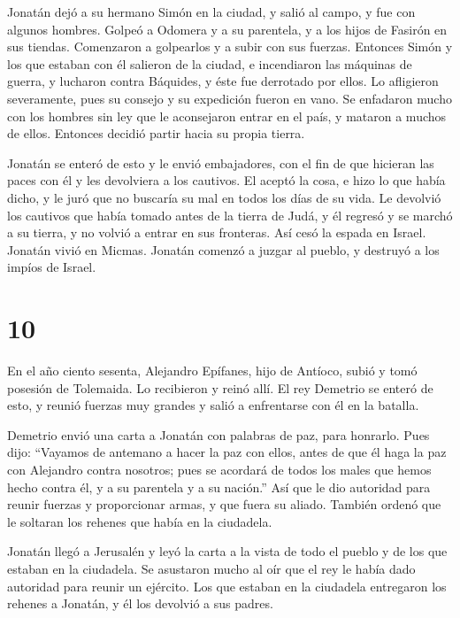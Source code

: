  Jonatán dejó a su hermano Simón en la ciudad, y salió al
campo, y fue con algunos hombres.  Golpeó a Odomera y a
su parentela, y a los hijos de Fasirón en sus tiendas. 
Comenzaron a golpearlos y a subir con sus fuerzas. Entonces Simón y los
que estaban con él salieron de la ciudad, e incendiaron las máquinas de
guerra,  y lucharon contra Báquides, y éste fue derrotado
por ellos. Lo afligieron severamente, pues su consejo y su expedición
fueron en vano.  Se enfadaron mucho con los hombres sin
ley que le aconsejaron entrar en el país, y mataron a muchos de ellos.
Entonces decidió partir hacia su propia tierra.

 Jonatán se enteró de esto y le envió embajadores, con el
fin de que hicieran las paces con él y les devolviera a los cautivos.
 El aceptó la cosa, e hizo lo que había dicho, y le juró
que no buscaría su mal en todos los días de su vida.  Le
devolvió los cautivos que había tomado antes de la tierra de Judá, y él
regresó y se marchó a su tierra, y no volvió a entrar en sus fronteras.
 Así cesó la espada en Israel. Jonatán vivió en Micmas.
Jonatán comenzó a juzgar al pueblo, y destruyó a los impíos de Israel.

\hypertarget{section-9}{%
\section{10}\label{section-9}}

 En el año ciento sesenta, Alejandro Epífanes, hijo de
Antíoco, subió y tomó posesión de Tolemaida. Lo recibieron y reinó allí.
 El rey Demetrio se enteró de esto, y reunió fuerzas muy
grandes y salió a enfrentarse con él en la batalla.

 Demetrio envió una carta a Jonatán con palabras de paz,
para honrarlo.  Pues dijo: ``Vayamos de antemano a hacer
la paz con ellos, antes de que él haga la paz con Alejandro contra
nosotros;  pues se acordará de todos los males que hemos
hecho contra él, y a su parentela y a su nación.''  Así
que le dio autoridad para reunir fuerzas y proporcionar armas, y que
fuera su aliado. También ordenó que le soltaran los rehenes que había en
la ciudadela.

 Jonatán llegó a Jerusalén y leyó la carta a la vista de
todo el pueblo y de los que estaban en la ciudadela.  Se
asustaron mucho al oír que el rey le había dado autoridad para reunir un
ejército.  Los que estaban en la ciudadela entregaron los
rehenes a Jonatán, y él los devolvió a sus padres.

